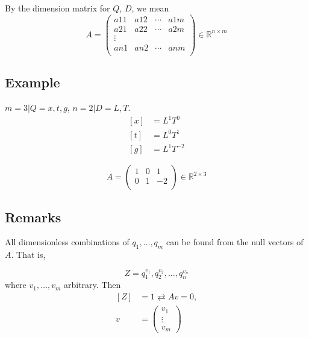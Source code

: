 \documentclass[12pt,twoside]{article}
\begin{document}
By the dimension matrix for $Q$, $D$, we mean
\begin{equation}
  A =
  \begin{pmatrix}
    a11 & a12 & \cdots & a1m \\
    a21 & a22 & \cdots & a2m \\
    \vdots & & & \\
    an1 & an2 & \cdots & anm \\
  \end{pmatrix}
  \in \mathbb{R}^{n\times m}
\end{equation}

\subsection{Example}
$m = 3 | Q = {x, t, g}$, $n = 2 | D = {L, T}$.
\begin{equation}
  \begin{aligned}
    [x] &= L^1 T^0 \\
    [t] &= L^0 T^1 \\
    [g] &= L^1 T^{-2}
  \end{aligned}
\end{equation}

\begin{equation}
  A =
  \begin{pmatrix}
    1 & 0 & 1 \\
    0 & 1 & -2 \\
  \end{pmatrix}
  \in \mathbb{R}^{2\times3}
\end{equation}

\subsection{Remarks}
All dimensionless combinations of $q_1,\ldots,q_m$ can be found from the null
vectors of $A$. That is,

$$Z = q_1^{v_1}, q_2^{v_2}, \ldots, q_n^{v_n}$$ where $v_1, \ldots, v_m$
arbitrary. Then
\begin{equation}
  \begin{aligned}
    [Z] &= 1 \rightleftarrows Av=0, \\
    v &= \begin{pmatrix} v_1 \\ \vdots \\ v_m \end{pmatrix}
  \end{aligned}
\end{equation}
\end{document}
